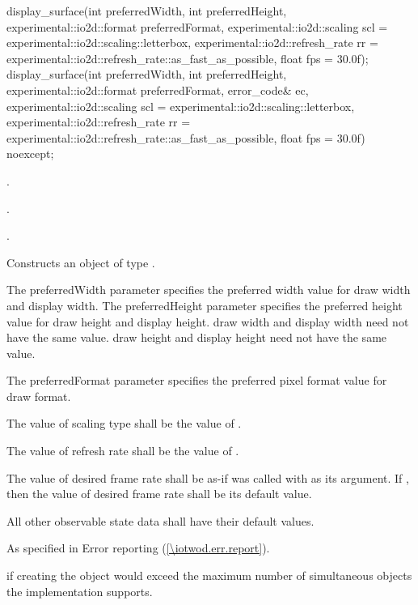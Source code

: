 %
\begin{itemdecl}
display_surface(int preferredWidth, int preferredHeight, 
  experimental::io2d::format preferredFormat,
  experimental::io2d::scaling scl = experimental::io2d::scaling::letterbox,
  experimental::io2d::refresh_rate rr =
  experimental::io2d::refresh_rate::as_fast_as_possible, float fps = 30.0f);
display_surface(int preferredWidth, int preferredHeight, 
  experimental::io2d::format preferredFormat, error_code& ec,
  experimental::io2d::scaling scl = experimental::io2d::scaling::letterbox,
  experimental::io2d::refresh_rate rr =
  experimental::io2d::refresh_rate::as_fast_as_possible, float fps = 30.0f)
  noexcept;
\end{itemdecl}
\begin{itemdescr}
\pnum
\requires
{}.

\pnum
{}.

\pnum
{}.


\pnum
\effects
Constructs an object of type .

\pnum
The preferredWidth parameter specifies the preferred width value for draw width and display width. The preferredHeight parameter specifies the preferred height value for draw height and display height. draw width and display width need not have the same value. draw height and display height need not have the same value.

\pnum
The preferredFormat parameter specifies the preferred pixel format value for draw format.

\pnum
The value of scaling type shall be the value of .

\pnum
The value of refresh rate shall be the value of .

\pnum
The value of desired frame rate shall be as-if  was called with  as its argument. If , then the value of desired frame rate shall be its default value.

\pnum
All other observable state data shall have their default values.

\pnum
\throws
As specified in Error reporting (\ref{\iotwod.err.report}).

\pnum
\errors
{} if creating the  object would exceed the maximum number of simultaneous  objects the implementation supports.
\end{itemdescr}

